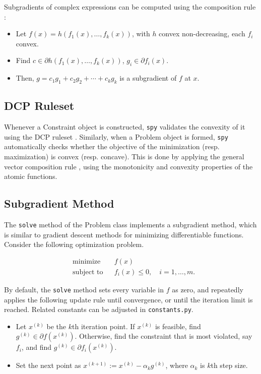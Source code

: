 \documentclass[12pt]{article}
\begin{document}
Subgradients of complex expressions can be computed using the composition rule \cite{subg}:
\begin{itemize}
\item Let $f(x) = h(f_1(x), \ldots, f_k(x))$, with $h$ convex non-decreasing,
  each $f_i$ convex.
\item Find $c \in \partial h(f_1(x), \ldots, f_k(x))$, $g_i \in \partial
  f_i(x)$.
\item Then, $g = c_1 g_1 + c_2 g_2 + \cdots + c_k g_k$ is a subgradient of $f$ at $x$.
\end{itemize}

\subsection{DCP Ruleset}
\label{dcp}
Whenever a Constraint object is constructed, \verb'spy' validates the convexity of it using the DCP ruleset \cite{guide}. Similarly, when a Problem object is formed, \verb'spy' automatically checks whether the objective of the minimization (resp. maximization) is convex (resp. concave). This is done by applying the general vector composition rule \cite{cvx}, using the monotonicity and convexity properties of the atomic functions.

\subsection{Subgradient Method}
\label{subgmethod}
The \verb'solve' method of the Problem class implements a subgradient method, which is similar to gradient descent methods for minimizing differentiable functions. Consider the following optimization problem.

\begin{equation*}
\begin{aligned}
&\mbox{minimize}&&f(x)\\
&\mbox{subject to}&&f_i(x) \le 0, \quad i = 1, \ldots, m.
\end{aligned}
\end{equation*}

By default, the \verb'solve' method sets every variable in $f$ as zero, and repeatedly applies the following update rule until convergence, or until the iteration limit is reached. Related constants can be adjusted in \verb'constants.py'.

\begin{itemize}
\item Let $x^{(k)}$ be the $k$th iteration point. If $x^{(k)}$ is feasible, find $g^{(k)} \in \partial f(x^{(k)})$. Otherwise, find the constraint that is most violated, say $f_i$, and find $g^{(k)} \in \partial f_i(x^{(k)})$.
\item Set the next point as $x^{(k+1)}:=x^{(k)}-\alpha_k g^{(k)}$, where $\alpha_k$ is $k$th step size.
\end{itemize}
\end{document}
